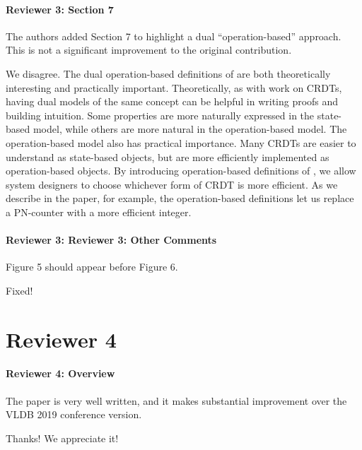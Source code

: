 \documentclass[9pt]{article}
\begin{document}
\begin{multicols*}{2}
\paragraph{Reviewer 3: Section 7}
\begin{feedback}
  The authors added Section 7 to highlight a dual ``operation-based'' approach.
  This is not a significant improvement to the original contribution.
\end{feedback}
We disagree. The dual operation-based definitions of \invariantconfluence{} are
both theoretically interesting and practically important. Theoretically, as
with work on CRDTs, having dual models of the same concept can be helpful in
writing proofs and building intuition. Some properties are more naturally
expressed in the state-based model, while others are more natural in the
operation-based model. The operation-based model also has practical importance.
Many CRDTs are easier to understand as state-based objects, but are more
efficiently implemented as operation-based objects. By introducing
operation-based definitions of \invariantconfluence{}, we allow system
designers to choose whichever form of CRDT is more efficient. As we describe in
the paper, for example, the operation-based definitions let us replace a
PN-counter with a more efficient integer.

\paragraph{Reviewer 3: Reviewer 3: Other Comments}
\begin{feedback}
  Figure 5 should appear before Figure 6.
\end{feedback}
Fixed!

\section*{Reviewer 4}
\paragraph{Reviewer 4: Overview}
\begin{feedback}
  The paper is very well written, and it makes substantial improvement over the
  VLDB 2019 conference version.
\end{feedback}
Thanks! We appreciate it!


\end{multicols*}
\end{document}
